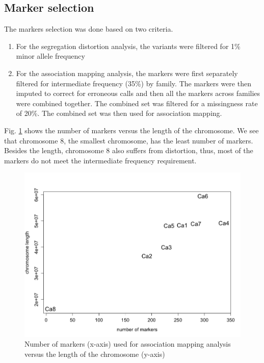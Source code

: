 \subsection{Marker selection}

The markers selection was done based on two criteria.
\begin{enumerate}
    \item For the segregation distortion analysis, the variants were filtered for 1\% minor allele frequency
    \item For the association mapping analysis, the markers were first separately filtered for intermediate frequency (35\%) by family. The markers were then imputed to correct for erroneous calls and then all the markers across families were combined together. The combined set was filtered for a missingness rate of 20\%. The combined set was then used for association mapping. 
\end{enumerate}
Fig. \ref{fig:marker-by-length} shows the number of markers versus the length of the chromosome. We see that chromosome 8, the smallest chromosome, has the least number of markers. Besides the length, chromosome 8 also suffers from distortion, thus, most of the markers do not meet the intermediate frequency requirement. 

\begin{figure}
    \centering
    \includegraphics[scale = 0.45]{tex/chickpea/marker-by-length.jpeg}
    \caption{Number of markers (x-axis) used for association mapping analysis versus the length of the chromosome (y-axis) }
    \label{fig:marker-by-length}
\end{figure}

